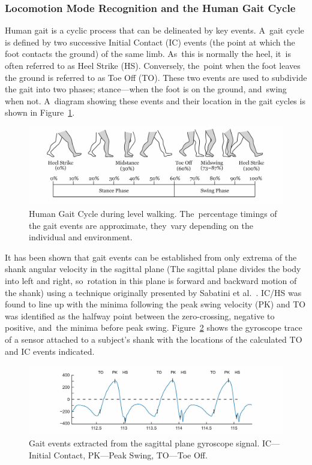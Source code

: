 \subsubsection{Locomotion Mode Recognition and the Human Gait Cycle}

Human gait is a cyclic process that can be delineated by key events. A~gait cycle is defined by two successive Initial Contact (IC) events (the point at which the foot contacts the ground) of the same limb. As~this is normally the heel, it~is often referred to as Heel Strike (HS). Conversely, the~point when the foot leaves the ground is referred to as Toe Off (TO). These two events are used to subdivide the gait into two phases; stance---when the foot is on the ground, and~swing when not. A~diagram showing these events and their location in the gait cycles is shown in Figure~\ref{fig:gait_cycle}.

\begin{figure}[!hbt]
    \centering
    \includegraphics[width=\textwidth]{content/4-LSTM_Behaviour/Gait_Cycle.jpg}
    \caption{Human Gait Cycle during level walking. The~percentage timings of the gait events are approximate, they~vary depending on the individual and environment.}
    \label{fig:gait_cycle}
\end{figure}

It has been shown that gait events can be established from only extrema of the shank angular velocity in the sagittal plane (The sagittal plane divides the body into left and right, so~rotation in this plane is forward and backward motion of the shank) using a technique originally presented by Sabatini et al.~\cite{Sabatini2005}. IC/HS was found to line up with the minima following the peak swing velocity (PK) and TO was identified as the halfway point between the zero-crossing, negative to positive, and~the minima before peak swing. \mbox{Figure~\ref{fig:y-gyro-hs-to}} shows the gyroscope trace of a sensor attached to a subject's shank with the locations of the calculated TO and IC events indicated.

\begin{figure}[!hbt]
    \centering
    \includegraphics[width=\textwidth]{content/4-LSTM_Behaviour/gyro_trace_hs.jpg}
    \caption{Gait events extracted
 from the sagittal plane gyroscope signal. IC---Initial Contact, PK---Peak Swing, TO---Toe Off.}
    \label{fig:y-gyro-hs-to}
\end{figure}

